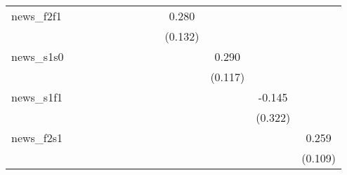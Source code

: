 {\begin{tabular}{l*{12}{c}}
\addlinespace
news\_f2f1   &                     &                     &                     &                     &                     &                     &                     &                     &       0.280\sym{**} &                     &                     &                     \\
            &                     &                     &                     &                     &                     &                     &                     &                     &     (0.132)         &                     &                     &                     \\
\addlinespace
news\_s1s0   &                     &                     &                     &                     &                     &                     &                     &                     &                     &       0.290\sym{**} &                     &                     \\
            &                     &                     &                     &                     &                     &                     &                     &                     &                     &     (0.117)         &                     &                     \\
\addlinespace
news\_s1f1   &                     &                     &                     &                     &                     &                     &                     &                     &                     &                     &      -0.145         &                     \\
            &                     &                     &                     &                     &                     &                     &                     &                     &                     &                     &     (0.322)         &                     \\
\addlinespace
news\_f2s1   &                     &                     &                     &                     &                     &                     &                     &                     &                     &                     &                     &       0.259\sym{**} \\
            &                     &                     &                     &                     &                     &                     &                     &                     &                     &                     &                     &     (0.109)         \\

\end{tabular}}
